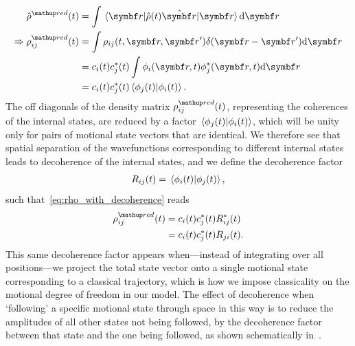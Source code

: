 \begin{align}
\hat\rho^\up{red}(t) &= \int\matrixel{\vec r}{\hat \rho(t) \hat {\vec r}}{\vec r}\dd \vec r\\
\Rightarrow \rho^\up{red}_{ij}(t) &= \int\rho_{ij}(t, \vec r, \vec r^\prime)\delta(\vec r - \vec r^\prime)\dd \vec r\\
&= c_i(t) c_j^*(t)\int\phi_i(\vec r, t)\phi_j^*(\vec r, t)\dd \vec r\\
&= c_i(t) c_j^*(t)\braket{\phi_j(t)}{\phi_i(t)}\label{eq:rho_with_decoherence}.
\end{align}
The off diagonals of the density matrix $\rho^\up{red}_{ij}(t)$, representing the coherences of the internal states, are reduced by a factor $\braket{\phi_j(t)}{\phi_i(t)}$, which will be unity only for pairs of motional state vectors that are identical. We therefore see that spatial separation of the wavefunctions corresponding to different internal states leads to decoherence of the internal states, and we define the decoherence factor
\begin{align}\label{eq:decoherence_factor_definition}
R_{ij}(t) = \braket{\phi_i(t)}{\phi_j(t)},
\end{align}
such that~\eqref{eq:rho_with_decoherence} reads
\begin{align}
\rho^\up{red}_{ij}(t) &= c_i(t) c_j^*(t) R_{ij}^*(t) \nonumber\\
& = c_i(t) c_j^*(t) R_{ji}(t).
\end{align}
This same decoherence factor appears when---instead of integrating over all positions---we project the total state vector onto a single motional state corresponding to a classical trajectory, which is how we impose classicality on the motional degree of freedom in our model. The effect of decoherence when `following' a specific motional state through space in this way is to reduce the amplitudes of all other states not being followed, by the decoherence factor between that state and the one being followed, as shown schematically in~.

